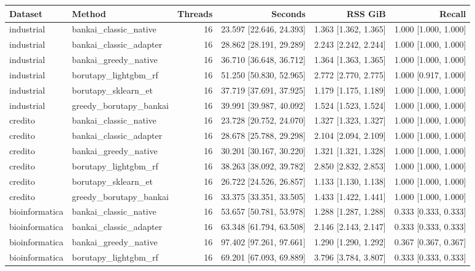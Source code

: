 \begin{tabular}{llrrrr}
Dataset & Method & Threads & Seconds & RSS GiB & Recall \\
\hline
industrial & bankai\_classic\_native & 16 & 23.597 [22.646, 24.393] & 1.363 [1.362, 1.365] & 1.000 [1.000, 1.000] \\
industrial & bankai\_classic\_adapter & 16 & 28.862 [28.191, 29.289] & 2.243 [2.242, 2.244] & 1.000 [1.000, 1.000] \\
industrial & bankai\_greedy\_native & 16 & 36.710 [36.648, 36.712] & 1.364 [1.363, 1.365] & 1.000 [1.000, 1.000] \\
industrial & borutapy\_lightgbm\_rf & 16 & 51.250 [50.830, 52.965] & 2.772 [2.770, 2.775] & 1.000 [0.917, 1.000] \\
industrial & borutapy\_sklearn\_et & 16 & 37.719 [37.691, 37.925] & 1.179 [1.175, 1.189] & 1.000 [1.000, 1.000] \\
industrial & greedy\_borutapy\_bankai & 16 & 39.991 [39.987, 40.092] & 1.524 [1.523, 1.524] & 1.000 [1.000, 1.000] \\
credito & bankai\_classic\_native & 16 & 23.728 [20.752, 24.070] & 1.327 [1.323, 1.327] & 1.000 [1.000, 1.000] \\
credito & bankai\_classic\_adapter & 16 & 28.678 [25.788, 29.298] & 2.104 [2.094, 2.109] & 1.000 [1.000, 1.000] \\
credito & bankai\_greedy\_native & 16 & 30.201 [30.167, 30.220] & 1.321 [1.321, 1.328] & 1.000 [1.000, 1.000] \\
credito & borutapy\_lightgbm\_rf & 16 & 38.263 [38.092, 39.782] & 2.850 [2.832, 2.853] & 1.000 [1.000, 1.000] \\
credito & borutapy\_sklearn\_et & 16 & 26.722 [24.526, 26.857] & 1.133 [1.130, 1.138] & 1.000 [1.000, 1.000] \\
credito & greedy\_borutapy\_bankai & 16 & 33.375 [33.351, 33.505] & 1.433 [1.422, 1.441] & 1.000 [1.000, 1.000] \\
bioinformatica & bankai\_classic\_native & 16 & 53.657 [50.781, 53.978] & 1.288 [1.287, 1.288] & 0.333 [0.333, 0.333] \\
bioinformatica & bankai\_classic\_adapter & 16 & 63.348 [61.794, 63.508] & 2.146 [2.143, 2.147] & 0.333 [0.333, 0.333] \\
bioinformatica & bankai\_greedy\_native & 16 & 97.402 [97.261, 97.661] & 1.290 [1.290, 1.292] & 0.367 [0.367, 0.367] \\
bioinformatica & borutapy\_lightgbm\_rf & 16 & 69.201 [67.093, 69.889] & 3.796 [3.784, 3.807] & 0.333 [0.333, 0.333] \\

\end{tabular}

